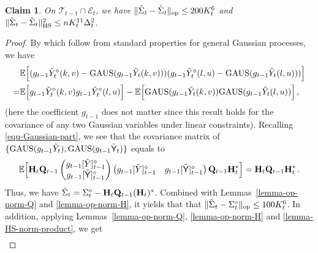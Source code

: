 \documentclass[11pt]{article}
\newtheorem{Claim}[Theorem]{Claim}
\numberwithin{equation}{section}
\begin{document}
\begin{Claim} \label{claim-op-HS-norm-W-minus-V}
On  $\mathcal T_{t-1}\cap \mathcal E_t$, we have $\| \Tilde{\Sigma}_{t} - \Check{\Sigma}_{t} \|_{\mathrm{op}} \leq 200K_{t}^{6}$ and $\| \Tilde{\Sigma}_{t} - \Check{\Sigma}_{t} \|_{\mathrm{HS}}^2 \leq n K_{t}^{11} \Delta_{t}^2$.
\end{Claim}
\begin{proof}
By \cite[(3.12),(3.61)]{DL22+} which follow from standard properties for general Gaussian processes, we have
\begin{align*}
    & \mathbb{E} \Big[ ( g_{t-1} \Tilde{Y}_{t}^{\diamond}(k,v) - \mathrm{GAUS}( g_{t-1} \Tilde{Y}_{t}(k,v))) ( g_{t-1} \Tilde{Y}_{t}^{\diamond}(l,u) - \mathrm{GAUS}(g_{t-1} \Tilde{Y}_{t}(l,u))) \Big] \\
    = & \mathbb{E} \Big[ g_{t-1} \Tilde{Y}_{t}^{\diamond}(k,v) g_{t-1} \Tilde{Y}_{t}^{\diamond}(l,u) \Big] - \mathbb{E} \Big[ \mathrm{GAUS}( g_{t-1} \Tilde{Y}_{t}(k,v)) \mathrm{GAUS}(g_{t-1} \Tilde{Y}_{t}(l,u)) \Big] \,,
\end{align*}
(here the coefficient $g_{t-1}$ does not matter since this result holds for the covariance of any two Gaussian variables under linear constraints).
Recalling \eqref{equ-Gaussian-part}, we see that the covariance matrix of $\{ \mathrm{GAUS}(g_{t-1} \Tilde{Y}_{t}), \mathrm{GAUS}( g_{t-1} \Tilde{\mathsf{Y}}_{t}) \}$ equals to
\begin{align*}
    \mathbb{E} \Big[ \mathbf{H}_{t} \mathbf{Q}_{t-1}
    \begin{pmatrix}
        g_{t-1} [\Tilde{Y}]_{t-1}^{\diamond} \\
        g_{t-1} [\Tilde{\mathsf{Y}}]_{t-1}^{\diamond}  
    \end{pmatrix}
    \begin{pmatrix}
        g_{t-1} [\Tilde{Y}]_{t-1}^{\diamond} &
        g_{t-1} [\Tilde{\mathsf{Y}}]_{t-1}^{\diamond}  
    \end{pmatrix}
    \mathbf{Q}_{t-1} \mathbf{H}_{t}^{*} \Big] 
    =  \mathbf{H}_{t} \mathbf{Q}_{t-1} \mathbf{H}_{t}^{*} \,.
\end{align*}
Thus, we have $\Tilde{\Sigma}_{t} = \Sigma^{\diamond}_{t} -  \mathbf{H}_{t} \mathbf{Q}_{t-1} (\mathbf{H}_{t})^{*}$. Combined with Lemmas~\ref{lemma-op-norm-Q} and \ref{lemma-op-norm-H}, it yields that that $\| \Tilde{\Sigma}_{t} - \Sigma^{\diamond}_{t} \|_{\mathrm{op}} \leq 100K_{t}^6$.  In addition, applying Lemmas~\ref{lemma-op-norm-Q}, \ref{lemma-op-norm-H} and \ref{lemma-HS-norm-product}, we get
\begin{align}\label{eq-Tilde-diamond-HS-norm}

\end{align}
\end{proof}
\end{document}
